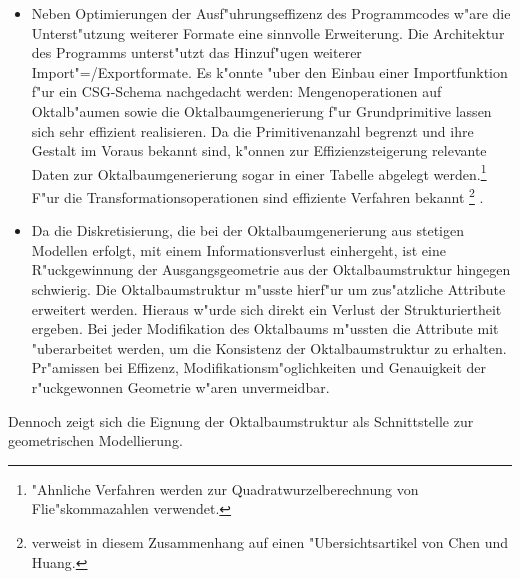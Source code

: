 \begin{itemize}
\item Neben Optimierungen der Ausf"uhrungseffizenz des Programmcodes 
w"are die Unterst"utzung weiterer Formate eine sinnvolle Erweiterung. Die 
Architektur des Programms unterst"utzt das Hinzuf"ugen weiterer 
Import"=/Exportformate. Es k"onnte "uber den Einbau einer Importfunktion f"ur 
ein CSG-Schema nachgedacht werden: Mengenoperationen auf Oktalb"aumen sowie 
die Oktalbaumgenerierung f"ur Grundprimitive lassen sich sehr effizient 
realisieren. Da die Primitivenanzahl begrenzt und ihre Gestalt im Voraus 
bekannt sind, k"onnen zur Effizienzsteigerung relevante Daten zur 
Oktalbaumgenerierung sogar in einer Tabelle abgelegt werden.\footnote{"Ahnliche
Verfahren werden zur Quadratwurzelberechnung von Flie"skommazahlen verwendet.}
F"ur die Transformationsoperationen sind effiziente Verfahren bekannt 
\footnote{\cite{diss_oct} verweist in diesem Zusammenhang auf einen 
"Ubersichtsartikel von Chen und Huang.}
.

\item Da die Diskretisierung, die bei der Oktalbaumgenerierung aus stetigen 
Modellen erfolgt, mit einem Informationsverlust einhergeht, ist eine 
R"uckgewinnung der Ausgangsgeometrie aus der Oktalbaumstruktur hingegen 
schwierig. Die Oktalbaumstruktur m"usste hierf"ur um zus"atzliche Attribute 
erweitert werden. 
Hieraus w"urde sich direkt ein Verlust der Strukturiertheit ergeben. Bei jeder 
Modifikation des Oktalbaums m"ussten die Attribute mit "uberarbeitet werden, 
um die Konsistenz der Oktalbaumstruktur zu erhalten. 
Pr"amissen bei Effizenz, Modifikationsm"oglichkeiten und Genauigkeit der 
r"uckgewonnen Geometrie w"aren unvermeidbar.
\end{itemize}

Dennoch zeigt sich die Eignung der Oktalbaumstruktur als Schnittstelle 
zur geometrischen Modellierung.

